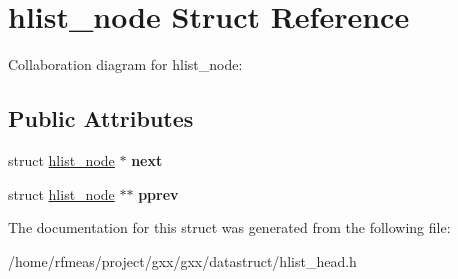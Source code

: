 \hypertarget{structhlist__node}{}\section{hlist\+\_\+node Struct Reference}
\label{structhlist__node}


Collaboration diagram for hlist\+\_\+node\+:
\subsection*{Public Attributes}
\begin{DoxyCompactItemize}
\item 
struct \hyperlink{structhlist__node}{hlist\+\_\+node} $\ast$ {\bfseries next}\hypertarget{structhlist__node_a915ba19b2ab3aa3f092edc8d5ed98c27}{}\label{structhlist__node_a915ba19b2ab3aa3f092edc8d5ed98c27}

\item 
struct \hyperlink{structhlist__node}{hlist\+\_\+node} $\ast$$\ast$ {\bfseries pprev}\hypertarget{structhlist__node_a4c25bc97aba8b77ee499b519df1cee43}{}\label{structhlist__node_a4c25bc97aba8b77ee499b519df1cee43}

\end{DoxyCompactItemize}


The documentation for this struct was generated from the following file\+:\begin{DoxyCompactItemize}
\item 
/home/rfmeas/project/gxx/gxx/datastruct/hlist\+\_\+head.\+h\end{DoxyCompactItemize}
